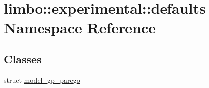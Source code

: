 \hypertarget{namespacelimbo_1_1experimental_1_1defaults}{}\section{limbo\+:\+:experimental\+:\+:defaults Namespace Reference}
\label{namespacelimbo_1_1experimental_1_1defaults}
\subsection*{Classes}
\begin{DoxyCompactItemize}
\item 
struct \hyperlink{structlimbo_1_1experimental_1_1defaults_1_1model__gp__parego}{model\+\_\+gp\+\_\+parego}
\end{DoxyCompactItemize}
